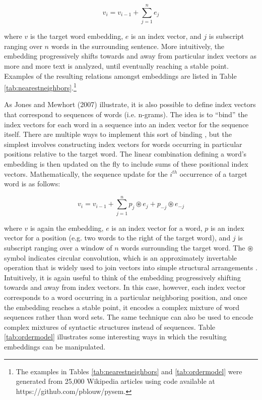 \begin{equation}
v_{i}=v_{i-1}+ \sum_{j=1}^{n} {e_j}
\end{equation}

\noindent
where $v$ is the target word embedding, $e$ is an index vector, and $j$ is subscript ranging over $n$ words in the surrounding sentence. More intuitively, the embedding progressively shifts towards and away from particular index vectors as more and more text is analyzed, until eventually reaching a stable point. Examples of the resulting relations amongst embeddings are listed in Table \ref{tab:nearestneighbors}.\footnote{The examples in Tables \ref{tab:nearestneighbors} and \ref{tab:ordermodel} were generated from 25,000 Wikipedia articles using code available at https://github.com/pblouw/pysem.}

As Jones and Mewhort (2007) illustrate, it is also possible to define index vectors that correspond to sequences of words (i.e. n-grams). The idea is to ``bind'' the index vectors for each word in a sequence into an index vector for the sequence itself. There are multiple ways to implement this sort of binding \citep[see e.g.][]{Sahlgren:2008,JonesMewhort:2007,Blouw:2013}, but the simplest involves constructing index vectors for words occurring in particular positions relative to the target word. The linear combination defining a word's embedding is then updated on the fly to include sums of these positional index vectors. Mathematically, the sequence update for the $i^{th}$ occurrence of a target word is as follows:

\begin{equation}
v_{i}=v_{i-1}+ \sum_{j=1}^{n} {p_j \circledast e_{j} + p_{-j} \circledast e_{-j}}
\end{equation}

\noindent
where $v$ is again the embedding, $e$ is an index vector for a word, $p$ is an index vector for a position (e.g. two words to the right of the target word), and $j$ is subscript ranging over a window of $n$ words surrounding the target word. The $ \circledast $ symbol indicates circular convolution, which is an approximately invertable operation that is widely used to join vectors into simple structural arrangements \citep{Plate:2003}. Intuitively, it is again useful to think of the embedding progressively shifting towards and away from index vectors. In this case, however, each index vector corresponds to a word occurring in a particular neighboring position, and once the embedding reaches a stable point, it encodes a complex mixture of word sequences rather than word sets. The same technique can also be used to encode complex mixtures of syntactic structures instead of sequences. Table \ref{tab:ordermodel} illustrates some interesting ways in which the resulting embeddings can be manipulated.

